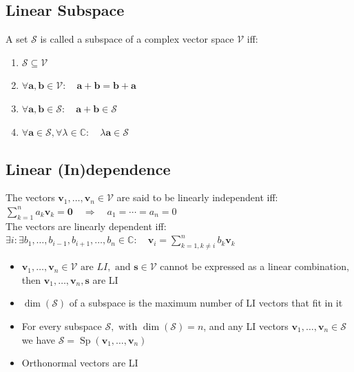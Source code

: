 \documentclass[english]{latex4ei/latex4ei_sheet}
\begin{document}
\begin{sectionbox}
  \subsection{Linear Subspace}
  A set $\mathcal{S}$ is called a subspace of a complex vector space $\mathcal{V}$ iff:
  \begin{enumerate}
    \item $\mathcal{S} \subseteq \mathcal{V}$    \item $\forall \boldsymbol{a}, \boldsymbol{b} \in \mathcal{V}: \quad \boldsymbol{a}+\boldsymbol{b}=\boldsymbol{b}+\boldsymbol{a}$
    \item $\forall \boldsymbol{a}, \boldsymbol{b} \in \mathcal{S}: \quad \boldsymbol{a}+\boldsymbol{b} \in \mathcal{S}$
    \item $\forall \boldsymbol{a} \in \mathcal{S}, \forall \lambda \in \mathbb{C}: \quad \lambda \boldsymbol{a} \in \mathcal{S}$
  \end{enumerate}
\end{sectionbox}

\begin{sectionbox}
  \subsection{Linear (In)dependence}
  The vectors $\boldsymbol{v}_{1}, \ldots, \boldsymbol{v}_{n} \in \mathcal{V}$ are said to be linearly independent iff:\\
  $\sum_{k=1}^{n} a_{k} \boldsymbol{v}_{k}=\mathbf{0} \quad \Longrightarrow \quad a_{1}=\cdots=a_{n}=0$\\
  
  The vectors are linearly dependent iff:\\
  $\exists i: \exists b_{1}, \ldots, b_{i-1}, b_{i+1}, \ldots, b_{n} \in \mathbb{C}: \quad \boldsymbol{v}_{i}=\sum\limits_{k=1, k \neq i}^{n} b_{k} \boldsymbol{v}_{k}$\\

  \begin{itemize}
    \item $\boldsymbol{v}_{1}, \ldots, \boldsymbol{v}_{n} \in \mathcal{V} \text { are } L I, \text { and } \boldsymbol{s} \in \mathcal{V}$ cannot be expressed as a linear combination, then $\boldsymbol{v}_{1}, \ldots, \boldsymbol{v}_{n}, \boldsymbol{s}$ are LI 
    \item $\operatorname{dim}(\mathcal{S})$ of a subspace is the maximum number of LI vectors that fit in it 
    \item For every subspace $\mathcal{S}, \text { with } \operatorname{dim}(\mathcal{S})=n$, and any LI vectors $\boldsymbol{v}_{1}, \ldots, \boldsymbol{v}_{n} \in \mathcal{S}$ we have $\mathcal{S}=\operatorname{Sp}\left(\boldsymbol{v}_{1}, \ldots, \boldsymbol{v}_{n}\right)$ 
    \item Orthonormal vectors are LI 
  \end{itemize}
\end{sectionbox}
\end{document}
